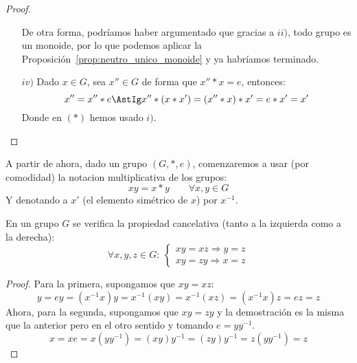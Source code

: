 \begin{prop}
\begin{proof}
\begin{enumerate}
                De otra forma, podríamos haber argumentado que gracias a $ii)$, todo grupo es un monoide, por lo que podemos aplicar la Proposición~\ref{prop:neutro_unico_monoide} y ya habríamos terminado.
            \item[$iv)$] Dado $x\in G$, sea $x'' \in G$ de forma que $x'' \ast x = e$, entonces:
                \begin{equation*}
                    x '' = x'' \ast e \AstIg x '' \ast (x \ast x') = (x '' \ast x) \ast x' = e \ast x' = x'
                \end{equation*}
                Donde en $(\ast)$ hemos usado $i)$.
        \end{enumerate}
    \end{proof}
\end{prop}


\begin{notacion}
    A partir de ahora, dado un grupo $(G,\ast,e)$, comenzaremos a usar (por comodidad) la notacion multiplicativa de los grupos:
    \begin{equation*}
        xy = x\ast y \qquad \forall x,y\in G
    \end{equation*}
    Y denotando a $x'$ (el elemento simétrico de $x$) por $x^{-1}$.
\end{notacion}

\begin{prop}
    En un grupo $G$ se verifica la propiedad cancelativa (tanto a la izquierda como a la derecha):
    \begin{equation*}
        \forall x,y,z\in G:\ \left\{\begin{array}{l}
            xy = xz \Longrightarrow y = z \\
            xy = zy \Longrightarrow x = z
        \end{array}\right.
    \end{equation*}
    \begin{proof}
        Para la primera, supongamos que $xy=xz$:
        \begin{equation*}
            y = ey = (x^{-1}x)y = x^{-1}(xy) = x^{-1}(xz) = (x^{-1}x)z = ez = z
        \end{equation*}
        Ahora, para la segunda, supongamos que $xy = zy$ y la demostración es la misma que la anterior pero en el otro sentido y tomando $e = yy^{-1}$.
        \begin{equation*}
            x = xe = x(yy^{-1}) = (xy)y^{-1} = (zy)y^{-1} = z(yy^{-1}) = z
        \end{equation*}
    \end{proof}
\end{prop}

